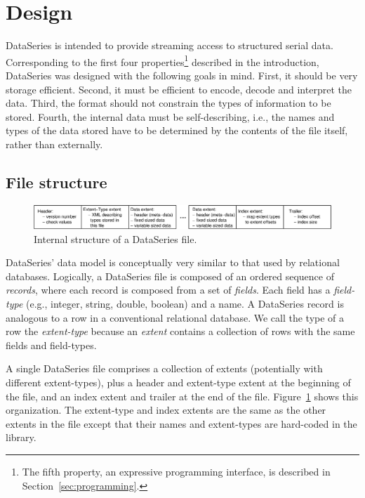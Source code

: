 \section{Design}\label{sec:design}

DataSeries is intended to provide streaming access to structured serial
data. Corresponding
to the first four properties\footnote{The fifth property, an expressive
programming interface, is described in Section~\ref{sec:programming}.}
described in the introduction, DataSeries was designed with the
following goals in mind. First, it should be very storage
efficient. Second, it must be efficient to encode, decode and
interpret the data.  Third, the format should not constrain the
types of information to be stored. Fourth, the internal data must be
self-describing, i.e., the names and types of the data stored have to
be determined by the contents of the file itself, rather than 
externally.

\subsection{File structure}\label{sec:structure}

\begin{figure}
\hfil\includegraphics[width=6.5in]{fig/ds-format2.eps}\hfil
\caption{Internal structure of a DataSeries file.}
\label{fig:dsorg}
\end{figure}

DataSeries' data model is conceptually very similar to that used
by relational databases. 
Logically, a DataSeries file is composed of an ordered sequence of
{\it records}, where each record is composed from a set of {\it
fields}. Each field has a {\it field-type} (e.g., integer, string, double,
boolean) and a name. A DataSeries record is analogous to a row in a
conventional relational database. We call the type of a row 
the {\it extent-type} because 
an {\it extent} contains a collection of rows with the same fields and 
field-types.

A single DataSeries file comprises a
collection of extents (potentially with different extent-types), plus a
header and extent-type extent at the beginning of the file, and an index extent and
trailer at the end of the file. Figure~\ref{fig:dsorg} shows
this organization.  The extent-type and index extents are the same as the
other extents in the file except that their names and extent-types are 
hard-coded in the library.

